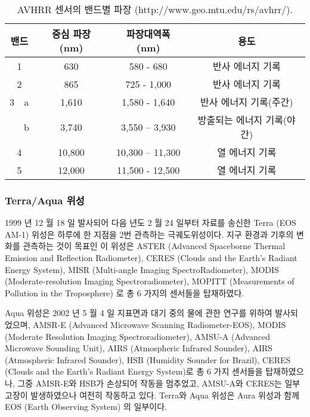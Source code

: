 \begin{table}[]
	\caption{AVHRR 센서의 밴드별 파장 (http://www.geo.mtu.edu/rs/avhrr/).}
	\begin{center}
	\begin{tabular}{c|c|c|c|c}
		\hline
		\multicolumn{2}{|c|}{밴드} & 중심 파장 (nm) & 파장대역폭 (nm)      & 용도              \\ \hline
		\multicolumn{2}{|c|}{1}  & 630        & 580 - 680       & 반사 에너지 기록       \\ \hline
		\multicolumn{2}{|c|}{2}  & 865        & 725 - 1,000     & 반사 에너지 기록       \\ \hline
		\multirow{}{}{3}  & a  & 1,610      & 1,580 - 1,640   & 반사 에너지 기록(주간)   \\ \cline{2-5} 
		& b  & 3,740      & 3,550 – 3,930   & 방출되는 에너지 기록(야간) \\ \hline
		\multicolumn{2}{|c|}{4}  & 10,800     & 10,300 – 11,300 & 열 에너지 기록        \\ \hline
		\multicolumn{2}{|c|}{5}  & 12,000     & 11,500 - 12,500 & 열 에너지 기록        \\ \hline
	\end{tabular}
	\end{center}
\end{table}


\subsubsection{Terra/Aqua 위성}

1999 년 12 월 18 일 발사되어 다음 년도 2 월 24 일부터 자료를 송신한 Terra (EOS AM-1) 위성은 하루에 한 지점을 2번 관측하는 극궤도위성이다. 지구 환경과 기후의 변화를 관측하는 것이 목표인 이 위성은 ASTER (Advanced Spaceborne Thermal Emission and Reflection Radiometer), CERES (Clouds and the Earth's Radiant Energy System), MISR (Multi-angle Imaging SpectroRadiometer), MODIS (Moderate-resolution Imaging Spectroradiometer), MOPITT (Measurements of Pollution in the Troposphere) 로 총 6 가지의 센서들을 탑재하였다. 

Aqua 위성은 2002 년 5 월 4 일 지표면과 대기 중의 물에 관한 연구를 위하여 발사되었으며, AMSR-E (Advanced Microwave Scanning Radiometer-EOS), MODIS (Moderate Resolution Imaging Spectroradiometer), AMSU-A (Advanced Microwave Sounding Unit), AIRS (Atmospheric Infrared Sounder), AIRS (Atmospheric Infrared Sounder), HSB (Humidity Sounder for Brazil), CERES (Clouds and the Earth's Radiant Energy System)로 총 6 가지 센서들을 탑재하였으나, 그중 AMSR-E와 HSB가 손상되어 작동을 멈추었고, AMSU-A와 CERES는 일부 고장이 발생하였으나 여전히 작동하고 있다. Terra와 Aqua 위성은 Aura 위성과 함께 EOS (Earth Observing System) 의 일부이다. 

